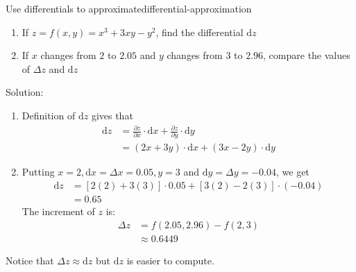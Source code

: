 \documentclass[math,code]{amznotes}
\theoremstyle{remark}
\begin{document}
\begin{exbox}{Use differentials to approximate}{differential-approximation}
    \begin{enumerate}
        \item If $z=f(x,y)=x^3+3xy-y^2$, find the differential $\mathrm d z$
        \item If $x$ changes from $2$ to $2.05$ and $y$ changes from $3$ to $2.96$, compare the values of $\Delta z$ and $\mathrm d z$
    \end{enumerate}
    {\color{blue} Solution}:
    \begin{enumerate}
        \item Definition of $\mathrm d z$ gives that
        \begin{align*}
            \mathrm d z&=\frac{\partial z}{\partial x}\cdot \mathrm d x+\frac{\partial z}{\partial y}\cdot \mathrm d y \\
            &=(2x+3y)\cdot \mathrm d x+(3x-2y)\cdot \mathrm d y  
        \end{align*}
        \item Putting $x=2, \mathrm d x=\Delta x=0.05, y=3$ and $\mathrm d y=\Delta y=-0.04$, we get
        \begin{align*}
            \mathrm d z&=[2(2)+3(3)]\cdot 0.05+[3(2)-2(3)]\cdot (-0.04) \\
            &=0.65
        \end{align*}
        The increment of $z$ is:
        \begin{align*}
            \Delta z &= f(2.05,2.96)-f(2,3) \\
            &\approx0.6449
        \end{align*}
    \end{enumerate}
    Notice that $\Delta z \approx \mathrm d z$ but $\mathrm d z$ is easier to compute.
\end{exbox}
\end{document}
